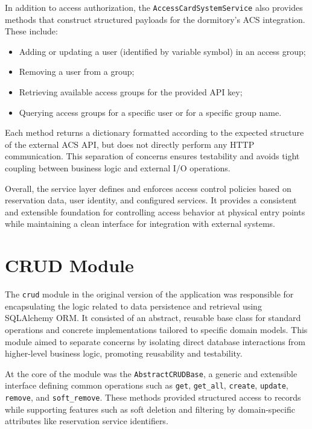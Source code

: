 In addition to access authorization, the \texttt{AccessCardSystemService} also provides methods that construct structured payloads for the dormitory’s ACS integration. These include:

\begin{itemize}
  \item Adding or updating a user (identified by variable symbol) in an access group;
  \item Removing a user from a group;
  \item Retrieving available access groups for the provided API key;
  \item Querying access groups for a specific user or for a specific group name.
\end{itemize}

Each method returns a dictionary formatted according to the expected structure of the external ACS API, but does not directly perform any HTTP communication. This separation of concerns ensures testability and avoids tight coupling between business logic and external I/O operations.

Overall, the service layer defines and enforces access control policies based on reservation data, user identity, and configured services. It provides a consistent and extensible foundation for controlling access behavior at physical entry points while maintaining a clean interface for integration with external systems.

\section{CRUD Module}

The \texttt{crud} module in the original version of the application was responsible for encapsulating the logic related to data persistence and retrieval using SQLAlchemy ORM. It consisted of an abstract, reusable base class for standard operations and concrete implementations tailored to specific domain models. This module aimed to separate concerns by isolating direct database interactions from higher-level business logic, promoting reusability and testability.

At the core of the module was the \texttt{AbstractCRUDBase}, a generic and extensible interface defining common operations such as \texttt{get}, \texttt{get\_all}, \texttt{create}, \texttt{update}, \texttt{remove}, and \texttt{soft\_remove}. These methods provided structured access to records while supporting features such as soft deletion and filtering by domain-specific attributes like reservation service identifiers.

